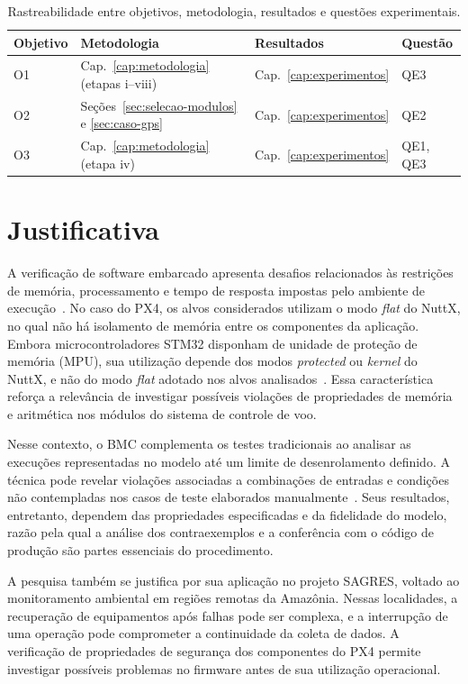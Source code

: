 \begin{table}[H]
\centering
\caption{Rastreabilidade entre objetivos, metodologia, resultados e questões experimentais.}
\label{tab:rastreabilidade}
\footnotesize
\begin{tabular}{@{}llll@{}}
\toprule
\textbf{Objetivo} & \textbf{Metodologia} &
\textbf{Resultados} & \textbf{Questão} \\
\midrule
O1 & Cap.~\ref{cap:metodologia} (etapas i--viii) &
Cap.~\ref{cap:experimentos} & QE3 \\
O2 & Seções~\ref{sec:selecao-modulos} e
\ref{sec:caso-gps} &
Cap.~\ref{cap:experimentos} & QE2 \\
O3 & Cap.~\ref{cap:metodologia} (etapa iv) &
Cap.~\ref{cap:experimentos} & QE1, QE3 \\
\bottomrule
\end{tabular}
\end{table}

\section{Justificativa}
\label{sec:justificativa}

A verificação de software embarcado apresenta desafios relacionados às restrições de memória, processamento e tempo de resposta impostas pelo ambiente de execução~\cite{Mzid2024}. No caso do PX4, os alvos considerados utilizam o modo \textit{flat} do NuttX, no qual não há isolamento de memória entre os componentes da aplicação. Embora microcontroladores STM32 disponham de unidade de proteção de memória (MPU), sua utilização depende dos modos \textit{protected} ou \textit{kernel} do NuttX, e não do modo \textit{flat} adotado nos alvos analisados~\cite{NuttX}. Essa característica reforça a relevância de investigar possíveis violações de propriedades de memória e aritmética nos módulos do sistema de controle de voo.

Nesse contexto, o BMC complementa os testes tradicionais ao analisar as execuções representadas no modelo até um limite de desenrolamento definido. A técnica pode revelar violações associadas a combinações de entradas e condições não contempladas nos casos de teste elaborados manualmente~\cite{Biere1999,Beyer2022}. Seus resultados, entretanto, dependem das propriedades especificadas e da fidelidade do modelo, razão pela qual a análise dos contraexemplos e a conferência com o código de produção são partes essenciais do procedimento.

A pesquisa também se justifica por sua aplicação no projeto SAGRES, voltado ao monitoramento ambiental em regiões remotas da Amazônia. Nessas localidades, a recuperação de equipamentos após falhas pode ser complexa, e a interrupção de uma operação pode comprometer a continuidade da coleta de dados. A verificação de propriedades de segurança dos componentes do PX4 permite investigar possíveis problemas no firmware antes de sua utilização operacional.

